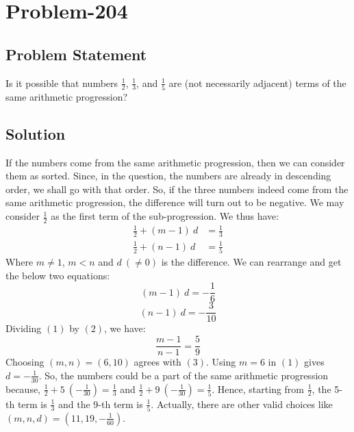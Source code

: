 \documentclass[12pt]{article}
\begin{document}
\section*{Problem-204}
\subsection*{Problem Statement}
Is it possible that numbers $\frac{1}{2}$, $\frac{1}{3}$, and $\frac{1}{5}$ are (not necessarily adjacent) terms of the same arithmetic progression?

\subsection*{Solution}
If the numbers come from the same arithmetic progression, then we can consider them as sorted. Since, in the question, the numbers are already in descending order, we shall go with that order. So, if the three numbers indeed come from the same arithmetic progression, the difference will turn out to be negative. We may consider $\frac{1}{2}$ as the first term of the sub-progression. We thus have:
\begin{equation*}
\begin{aligned}
\frac{1}{2} + (m-1)\ d &= \frac{1}{3}\\
\frac{1}{2} + (n-1)\ d &= \frac{1}{5}
\end{aligned}
\end{equation*}
Where $m \neq 1$, $m < n$ and $d\ (\neq 0)$ is the difference. We can rearrange and get the below two equations:
\begin{equation}
		(m-1)\ d = -\frac{1}{6}	
\end{equation}
\begin{equation}
		(n-1)\ d = -\frac{3}{10}	
\end{equation}
Dividing $(1)$ by $(2)$, we have:
\begin{equation}
	\frac{m-1}{n-1} = \frac{5}{9}
\end{equation}
Choosing $(m, n) = (6, 10)$ agrees with $(3)$. Using $m=6$ in $(1)$ gives $d = -\frac{1}{30}$. So, the numbers could be a part of the same arithmetic progression because, $\frac{1}{2} + 5\ \left( -\frac{1}{30} \right) = \frac{1}{3}$ and $\frac{1}{2} + 9 \ \left( -\frac{1}{30} \right) = \frac{1}{5}$. Hence, starting from $\frac{1}{2}$, the 5-th term is $\frac{1}{3}$ and the 9-th term is $\frac{1}{5}$. Actually, there are other valid choices like $(m, n, d) = \left( 11, 19, -\frac{1}{60} \right)$.
\end{document}
